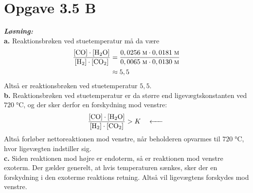 \documentclass{report}
\newcommand{\sol}{\setlength{\parindent}{0cm}\textbf{\textit{Løsning:}}\setlength{\parindent}{1cm}}
\begin{document}
\section*{Opgave 3.5 B}
\sol \\
\textbf{a.}
Reaktionsbrøken ved stuetemperatur må da være
\begin{equation*}
\begin{split}
  \frac{[\ce{CO} ] \cdot [\ce{H2O} ]}{[\ce{H2} ] \cdot [\ce{CO2}]}&=\frac{0,0256 \;\unit{\textsc{m}} \cdot 0,0181 \;\unit{\textsc{m}} }{0,0065 \;\unit{\textsc{m}} \cdot 0,0130 \;\unit{\textsc{m}} }\\ 
  &\approx 5,5
\end{split}
\end{equation*}
Altså er reaktionsbrøken ved stuetemperatur $5,5$.\\[1ex]
\textbf{b.}
Reaktionsbrøken ved stuetemperatur er da større end ligevægtskonstanten ved $720 \;\unit{\celsius} $, og der sker derfor en forskydning mod venstre:
\[
\frac{[\ce{CO} ] \cdot [\ce{H2O} ]}{[\ce{H2} ] \cdot [\ce{CO2}]}>K \quad \ce{<-} 
\] 
Altså forløber nettoreaktionen mod venstre, når beholderen opvarmes til $720 \;\unit{\celsius} $, hvor ligevægten indstiller sig.\\[1ex]
\textbf{c.}
Siden reaktionen mod højre er endoterm, så er reaktionen mod venstre exoterm.
Der gælder generelt, at hvis temperaturen sænkes, sker der en forskydning i den exoterme reaktions retning.
Altså vil ligevægtens forskydes mod venstre.
\end{document}
